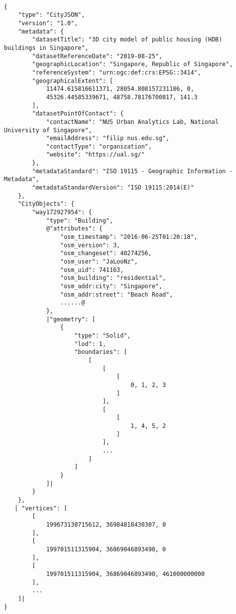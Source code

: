 \begin{scriptsize}
\begin{minipage}[c]{\linewidth / 1}


\begin{lstlisting}[frame=single,style=base,caption={Snippet of Singapore dataset}, label=dataset:hdb]

{
    "type": "CityJSON",
    "version": "1.0",
    "metadata": {
        "datasetTitle": "3D city model of public housing (HDB) buildings in Singapore",
        "datasetReferenceDate": "2019-08-25",
        "geographicLocation": "Singapore, Republic of Singapore",
        "referenceSystem": "urn:ogc:def:crs:EPSG::3414",
        "geographicalExtent": [
            11474.615816611371, 28054.808157231186, 0,
            45326.44585339671, 48758.78176700817, 141.3
        ],
        "datasetPointOfContact": {
            "contactName": "NUS Urban Analytics Lab, National University of Singapore",
            "emailAddress": "filip nus.edu.sg",
            "contactType": "organization",
            "website": "https://ual.sg/"
        },
        "metadataStandard": "ISO 19115 - Geographic Information - Metadata",
        "metadataStandardVersion": "ISO 19115:2014(E)"
    },
    "CityObjects": {
        "way172927954": {
            "type": "Building",
            @"attributes": {
                "osm_timestamp": "2016-06-25T01:20:18",
                "osm_version": 3,
                "osm_changeset": 40274256,
                "osm_user": "JaLooNz",
                "osm_uid": 741163,
                "osm_building": "residential",
                "osm_addr:city": "Singapore",
                "osm_addr:street": "Beach Road",
                ......@
            },
            |"geometry": [
                {
                    "type": "Solid",
                    "lod": 1,
                    "boundaries": [
                        [
                            [
                                [
                                    0, 1, 2, 3
                                ]
                            ],
                            [
                                [
                                    1, 4, 5, 2
                                ]
                            ],
                            ...
                        ]
                    ]
                }
            ]|
        }
    },
   | "vertices": [
        [
            199673130715612, 36984818430307, 0
        ],
        [
            199701511315904, 36869046893490, 0
        ],
        [
            199701511315904, 36869046893490, 461000000000
        ],
        ...
    ]|
}

\end{lstlisting}


\end{minipage}
\end{scriptsize}


